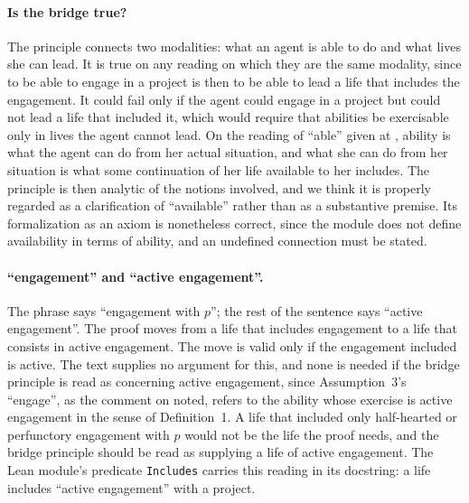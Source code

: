 \paragraph{Is the bridge true?} The principle connects two modalities: what an agent is able to do and what lives she can lead. It is true on any reading on which they are the same modality, since to be able to engage in a project is then to be able to lead a life that includes the engagement. It could fail only if the agent could engage in a project but could not lead a life that included it, which would require that abilities be exercisable only in lives the agent cannot lead. On the reading of \enquote{able} given at , ability is what the agent can do from her actual situation, and what she can do from her situation is what some continuation of her life available to her includes. The principle is then analytic of the notions involved, and we think it is properly regarded as a clarification of \enquote{available} rather than as a substantive premise. Its formalization as an axiom is nonetheless correct, since the module does not define availability in terms of ability, and an undefined connection must be stated.

\paragraph{\enquote{engagement} and \enquote{active engagement}.} The phrase says \enquote{engagement with $p$}; the rest of the sentence says \enquote{active engagement}. The proof moves from a life that includes engagement to a life that consists in active engagement. The move is valid only if the engagement included is active. The text supplies no argument for this, and none is needed if the bridge principle is read as concerning active engagement, since Assumption~3's \enquote{engage}, as the comment on  noted, refers to the ability whose exercise is active engagement in the sense of Definition~1. A life that included only half-hearted or perfunctory engagement with $p$ would not be the life the proof needs, and the bridge principle should be read as supplying a life of active engagement. The Lean module's predicate \texttt{Includes} carries this reading in its docstring: a life includes \enquote{active engagement} with a project.


